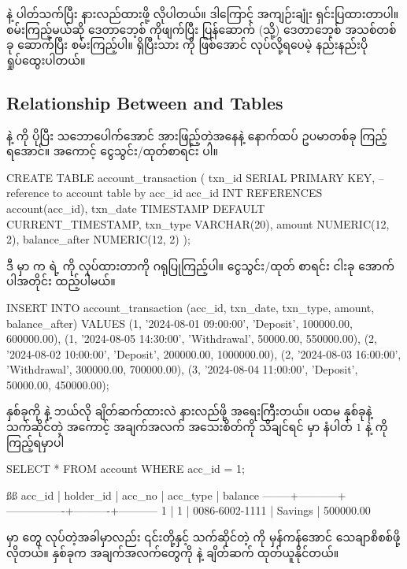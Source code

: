  နဲ့ ပါတ်သက်ပြီး နားလည်ထားဖို့ လိုပါတယ်။ ဒါကြောင့် အကျဉ်းချုံး ရှင်းပြထားတာပါ။  စမ်းကြည့်မယ်ဆို ဒေတာဘေ့စ် ကိုဖျက်ပြီး  ပြန်ဆောက် (သို့) ဒေတာဘေ့စ် အသစ်တစ်ခု ဆောက်ပြီး စမ်းကြည့်ပါ။ ရှိပြီးသား  ကို  ဖြစ်အောင် လုပ်လို့ရပေမဲ့ နည်းနည်းပိုရှုပ်ထွေးပါတယ်။

\subsection*{Relationship Between  and  Tables}
 နဲ့  ကို ပိုပြီး သဘောပေါက်အောင် အားဖြည့်တဲ့အနေနဲ့ နောက်ထပ် ဥပမာတစ်ခု ကြည့်ရအောင်။ အကောင့် ငွေသွင်း/ထုတ်စာရင်း   ပါ။
%
\begin{sql}
CREATE TABLE account_transaction (
    txn_id SERIAL PRIMARY KEY,
    -- reference to account table by acc_id
    acc_id INT REFERENCES account(acc_id),
    txn_date TIMESTAMP DEFAULT CURRENT_TIMESTAMP,
    txn_type VARCHAR(20),
    amount NUMERIC(12, 2),
    balance_after NUMERIC(12, 2)
);
\end{sql}
%
ဒီ  မှာ   က   ရဲ့   ကို  လုပ်ထားတာကို ဂရုပြုကြည့်ပါ။ ငွေသွင်း/ထုတ် စာရင်း  ငါးခု အောက်ပါအတိုင်း ထည့်ပါမယ်။ 
%
\begin{sql}
INSERT INTO account_transaction 
    (acc_id, txn_date, txn_type, amount, balance_after)
VALUES 
    (1, '2024-08-01 09:00:00', 'Deposit', 100000.00, 600000.00),
    (1, '2024-08-05 14:30:00', 'Withdrawal', 50000.00, 550000.00),
    (2, '2024-08-02 10:00:00', 'Deposit', 200000.00, 1000000.00),
    (2, '2024-08-03 16:00:00', 'Withdrawal', 300000.00, 700000.00),
    (3, '2024-08-04 11:00:00', 'Deposit', 50000.00, 450000.00);
\end{sql}
%
 နှစ်ခုကို  နဲ့ ဘယ်လို ချိတ်ဆက်ထားလဲ နားလည်ဖို့ အရေးကြီးတယ်။ ပထမ  နှစ်ခုနဲ့ သက်ဆိုင်တဲ့ အကောင့် အချက်အလက် အသေးစိတ်ကို သိချင်ရင်   မှာ  နံပါတ် $1$ နဲ့  ကို ကြည့်ရမှာပါ
%
\begin{sql}
SELECT * FROM account WHERE acc_id = 1;
\end{sql}
%
%
\begin{vbtm}
ßß
 acc_id | holder_id |     acc_no     | acc_type |  balance
--------+-----------+----------------+----------+-----------
      1 |         1 | 0086-6002-1111 | Savings  | 500000.00
\end{vbtm}
%
  မှာ  တွေ   လုပ်တဲ့အခါမှာလည်း ၎င်းတို့နှင့် သက်ဆိုင်တဲ့  ကို မှန်ကန်အောင် သေချာစိစစ်ဖို့ လိုတယ်။  နှစ်ခုက အချက်အလက်တွေကို  နဲ့ ချိတ်ဆက် ထုတ်ယူနိုင်တယ်။

